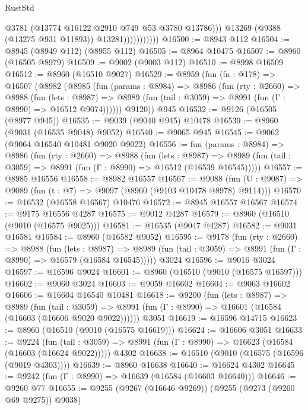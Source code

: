 \begin{lexlean}{RustStd}
\begin{coremodule}
                              @3781
                              (@13774 @16122 @2910 @749 @53 @3780 @13786)))
                          @13269
                          (@9388 (@13275 @931 @11893))
                          @13281)))))))))))
@16500 := @8943 @112
@16504 := @8945 (@8949 @112) (@8955 @112)
@16505 := @8964 @10475
@16507 := @8960 (@16505 @8979)
@16509 := @9002 (@9003 @112)
@16510 := @8998 @16509
@16512 := @8960 (@16510 @9027)
@16529 := @8959
    (fun (fn : @178) =>
    @16507
      (@8982
        (@8985
          (fun (params : @8984) =>
          @8986
            (fun (rty : @2660) =>
            @8988
              (fun (lets : @8987) =>
              @8989 (fun (tail : @3059) => @8991 (fun (Γ : @8990) => @16512 @9074))))))
        @9120))
    @945
@16532 := @9126 (@16505 (@8977 @945))
@16535 := @9039 (@9040 @945) @10478
@16539 := @8960 (@9031 (@16535 @9048) @9052)
@16540 := @9065 @945
@16545 := @9062 (@9064 @16540 @10481 @9020 @9022)
@16556 := fun (params : @8984) =>
  @8986
    (fun (rty : @2660) =>
    @8988
      (fun (lets : @8987) =>
      @8989 (fun (tail : @3059) => @8991 (fun (Γ : @8990) => @16512 (@16539 @16545)))))
@16557 := @8985 @16556
@16558 := @8982 @16557
@16567 := @9088
    (fun (U : @9087) => @9089 (fun (t : @7) => @9097 (@8960 (@9103 @10478 @8978) @9114)))
@16570 := @16532 (@16558 @16567) @10476
@16572 := @8945 @16557 @16567
@16574 := @9175 @16556 @4287
@16575 := @9012 @4287
@16579 := @8960 (@16510 (@9010 (@16575 @9025)))
@16581 := @16535 (@9047 @4287)
@16582 := @9031 @16581
@16584 := @8960 (@16582 @9052)
@16595 := @9178
    (fun (rty : @2660) =>
    @8988
      (fun (lets : @8987) =>
      @8989 (fun (tail : @3059) => @8991 (fun (Γ : @8990) => @16579 (@16584 @16545)))))
    @3024
@16596 := @9016 @3024
@16597 := @16596 @9024
@16601 := @8960 (@16510 (@9010 (@16575 @16597)))
@16602 := @9060 @3024
@16603 := @9059 @16602
@16604 := @9063 @16602
@16606 := @16604 @16540 @10481
@16618 := @9200
    (fun (lets : @8987) =>
    @8989
      (fun (tail : @3059) =>
      @8991 (fun (Γ : @8990) => @16601 (@16584 (@16603 (@16606 @9020 @9022))))))
    @3051
@16619 := @16596 @14715
@16623 := @8960 (@16510 (@9010 (@16575 @16619)))
@16624 := @16606 @3051
@16633 := @9224
    (fun (tail : @3059) => @8991 (fun (Γ : @8990) => @16623 (@16584 (@16603 (@16624 @9022)))))
    @4302
@16638 := @16510 (@9010 (@16575 (@16596 (@9019 @4303))))
@16639 := @8960 @16638
@16640 := @16624 @4302
@16645 := @9242 (fun (Γ : @8990) => @16639 (@16584 (@16603 @16640)))
@16646 := @9260 @77
@16655 := @9255 (@9267 (@16646 @9269)) (@9255 (@9273 (@9260 @69 @9275)) @9038)

\end{coremodule}
\end{lexlean}
